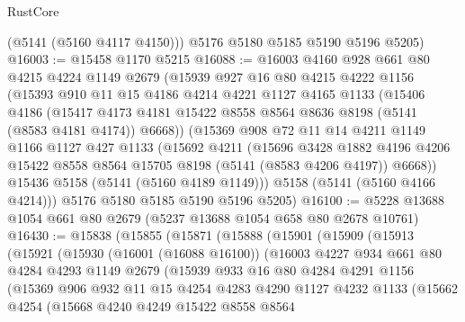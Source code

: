 \begin{lexlean}{RustCore}
\begin{coremodule}
        (@5141 (@5160 @4117 @4150)))
      @5176
      @5180
      @5185
      @5190
      @5196
      @5205)
@16003 := @15458 @1170 @5215
@16088 := @16003
    @4160
    @928
    @661
    @80
    @4215
    @4224
    @1149
    @2679
    (@15939
      @927
      @16
      @80
      @4215
      @4222
      @1156
      (@15393
        @910
        @11
        @15
        @4186
        @4214
        @4221
        @1127
        @4165
        @1133
        (@15406
          @4186
          (@15417 @4173 @4181 @15422 @8558 @8564 @8636 @8198 (@5141 (@8583 @4181 @4174)) @6668))
        (@15369
          @908
          @72
          @11
          @14
          @4211
          @1149
          @1166
          @1127
          @427
          @1133
          (@15692
            @4211
            (@15696
              @3428
              @1882
              @4196
              @4206
              @15422
              @8558
              @8564
              @15705
              @8198
              (@5141 (@8583 @4206 @4197))
              @6668))
          @15436
          @5158
          (@5141 (@5160 @4189 @1149)))
        @5158
        (@5141 (@5160 @4166 @4214)))
      @5176
      @5180
      @5185
      @5190
      @5196
      @5205)
@16100 := @5228 @13688 @1054 @661 @80 @2679 (@5237 @13688 @1054 @658 @80 @2678 @10761)
@16430 := @15838
    (@15855
      (@15871
        (@15888
          (@15901
            (@15909
              (@15913
                (@15921
                  (@15930
                    (@16001 (@16088 @16100))
                    (@16003
                      @4227
                      @934
                      @661
                      @80
                      @4284
                      @4293
                      @1149
                      @2679
                      (@15939
                        @933
                        @16
                        @80
                        @4284
                        @4291
                        @1156
                        (@15369
                          @906
                          @932
                          @11
                          @15
                          @4254
                          @4283
                          @4290
                          @1127
                          @4232
                          @1133
                          (@15662
                            @4254
                            (@15668
                              @4240
                              @4249
                              @15422
                              @8558
                              @8564

\end{coremodule}
\end{lexlean}
